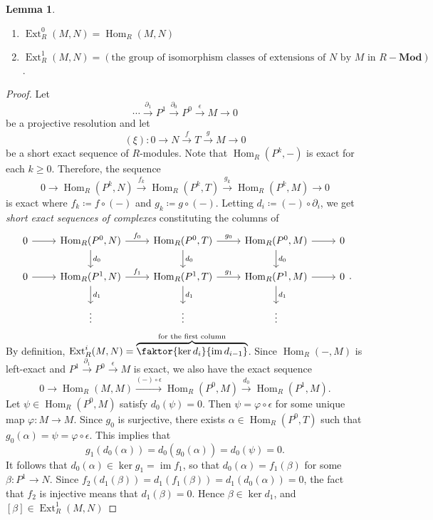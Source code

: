 \documentclass[10pt,letterpaper,cm]{nupset}
\theoremstyle{definition}
\theoremstyle{theorem}
\newtheorem{lemma}[definition]{Lemma}
\theoremstyle{remark}
\newcommand{\1}{\mathbf{1}}
\newcommand{\0}{\vec 0}
\DeclareMathOperator{\ext}{Ext}
\DeclareMathOperator{\im}{im}
\DeclareMathOperator{\Hom}{Hom}
\begin{document}
\begin{lemma} $ $
\begin{enumerate}
\item $\ext^0_R(M, N) = \Hom_R(M, N)$
\item $\ext^1_R(M, N) = \left( \text{the group of isomorphism classes of extensions of } N \text{ by } M\text{ in } R{-}\mathbf{Mod}    \right)$.
\end{enumerate}                                                                                                \end{lemma}
\begin{proof}
Let $$\cdots \overset{\partial_1}{\longrightarrow} P^1 \overset{\partial_0}{\longrightarrow} P^0  \overset{\epsilon}{\longrightarrow} M \to 0$$ be a projective resolution and
let $$(\xi) : 0 \to N \overset{f}{\longrightarrow} T \overset{g}{\longrightarrow} M \to 0$$ be a short exact sequence of $R$-modules.
Note that $\Hom_R(P^k, -)$ is exact for each $k\geq 0$. Therefore, the sequence $$ 0 \to \Hom_R(P^k, N) \overset{f_k}{\longrightarrow} \Hom_R(P^k, T) \overset{g_k}{\longrightarrow} \Hom_R(P^k, M) \to 0   $$ is exact where $f_k \coloneqq  f\circ (-)$ and $g_k \coloneqq  g \circ (-)$. Letting $d_i \coloneqq  (-)\circ \partial_i$, we get \textit{short exact sequences of complexes} constituting the columns of 
\[
\begin{tikzcd}
0 \arrow[r] & {\Hom_R(P^0, N)} \arrow[r, "f_0"] \arrow[d, "d_0"] & {\Hom_R(P^0, T)} \arrow[r, "g_0"] \arrow[d, "d_0"] & {\Hom_R(P^0, M)} \arrow[r] \arrow[d, "d_0"] & 0 \\
0 \arrow[r] & {\Hom_R(P^1, N)} \arrow[r, "f_1"] \arrow[d, "d_1"] & {\Hom_R(P^1, T)} \arrow[r, "g_1"] \arrow[d, "d_1"] & {\Hom_R(P^1, M)} \arrow[r] \arrow[d, "d_1"] & 0 \\
 & \vdots & \vdots & \vdots & 
\end{tikzcd}
.\]
By definition, $\ext_R^i(M, N) = \overbrace{\faktor{\ker{d_i}}{\im{d_{i-1}}}}^{\text{for the first column}}$. Since $\Hom_R(-, M)$ is left-exact and $P^1 \overset{\partial_1}{\longrightarrow} P^0 \overset{\epsilon}{\longrightarrow} M$ is exact, we also have the exact sequence $$ 0 \to \Hom_R(M, M) \overset{(-) \circ \epsilon}{\longrightarrow} \Hom_R(P^0, M) \overset{d_0}{\longrightarrow} \Hom_R(P^1, M) .  $$ 
Let $\psi \in \Hom_R(P^0, M)$ satisfy $d_0(\psi) =0$. Then $\psi = \varphi \circ \epsilon$ for some unique map $\varphi : M\to M$. Since $g_0$ is surjective, there exists $\alpha \in \Hom_R(P^0, T)$ such that $g_0(\alpha) = \psi = \varphi \circ \epsilon $. This implies that $$g_1(d_0(\alpha)) = d_0(g_0(\alpha)) = d_0(\psi) =0.$$ It follows that $d_0(\alpha) \in \ker{g_1} = \im{f_1}$, so that $d_0(\alpha) = f_1(\beta)$ for some $\beta : P^1 \to N$. Since $f_2(d_1(\beta))=d_1(f_1(\beta))= d_1(d_0(\alpha)) = 0$, the fact that $f_2$ is injective means that $d_1(\beta) =0$. Hence $\beta \in \ker{d_1}$, and $[\beta] \in \ext^1_R(M, N)$ 

\end{proof}
\end{document}
